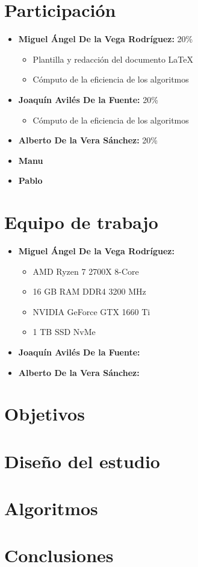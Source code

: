\documentclass[11pt]{article}
\begin{document}
                                                

\tableofcontents %

\newpage %

\section{Participación}
\begin{itemize}
    \item \textbf{Miguel Ángel De la Vega Rodríguez:} 20\%
    \begin{itemize}
        \item Plantilla y redacción del documento \LaTeX
        \item Cómputo de la eficiencia de los algoritmos
    \end{itemize}
    \item \textbf{Joaquín Avilés De la Fuente:} 20\%
    \begin{itemize}
        \item Cómputo de la eficiencia de los algoritmos
    \end{itemize}
    \item \textbf{Alberto De la Vera Sánchez: } 20\%
    \item \textbf{Manu}
    \item \textbf{Pablo}
\end{itemize}

\section{Equipo de trabajo}

\begin{itemize}
    \item \textbf{Miguel Ángel De la Vega Rodríguez:}
        \begin{itemize}
            \item AMD Ryzen 7 2700X 8-Core
            \item 16 GB RAM DDR4 3200 MHz
            \item NVIDIA GeForce GTX 1660 Ti 
            \item 1 TB SSD NvMe 
        \end{itemize}
    \item \textbf{Joaquín Avilés De la Fuente:}
    \item \textbf{Alberto De la Vera Sánchez:}
\end{itemize}

\section{Objetivos}
\section{Diseño del estudio}
\section{Algoritmos}
\section{Conclusiones}
\end{document}
